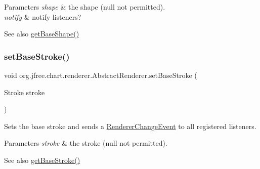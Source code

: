 \begin{DoxyParams}{Parameters}
{\em shape} & the shape ({\ttfamily null} not permitted). \\
\hline
{\em notify} & notify listeners?\\
\hline
\end{DoxyParams}
\begin{DoxySeeAlso}{See also}
\mbox{\hyperlink{classorg_1_1jfree_1_1chart_1_1renderer_1_1_abstract_renderer_a43dcca93629b149904310c59176c889a}{get\+Base\+Shape()}} 
\end{DoxySeeAlso}
\mbox{\label{classorg_1_1jfree_1_1chart_1_1renderer_1_1_abstract_renderer_a33600c32414c464c6394827d61f9b374}} 
\subsubsection{\texorpdfstring{set\+Base\+Stroke()}{setBaseStroke()}\hspace{0.1cm}{\footnotesize\ttfamily [1/2]}}
{\footnotesize\ttfamily void org.\+jfree.\+chart.\+renderer.\+Abstract\+Renderer.\+set\+Base\+Stroke (\begin{DoxyParamCaption}\item[{Stroke}]{stroke }\end{DoxyParamCaption})}

Sets the base stroke and sends a \mbox{\hyperlink{}{Renderer\+Change\+Event}} to all registered listeners.


\begin{DoxyParams}{Parameters}
{\em stroke} & the stroke ({\ttfamily null} not permitted).\\
\hline
\end{DoxyParams}
\begin{DoxySeeAlso}{See also}
\mbox{\hyperlink{classorg_1_1jfree_1_1chart_1_1renderer_1_1_abstract_renderer_a7590a423fb0ba5895a876a7068b37951}{get\+Base\+Stroke()}} 
\end{DoxySeeAlso}
\mbox{\label{classorg_1_1jfree_1_1chart_1_1renderer_1_1_abstract_renderer_acd0db81ab3940b3e32648ffdce99ed21}} 
